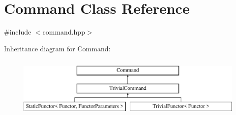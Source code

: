 \hypertarget{class_command}{}\section{Command Class Reference}
\label{class_command}


{\ttfamily \#include $<$command.\+hpp$>$}

Inheritance diagram for Command\+:\begin{figure}[H]
\begin{center}
\leavevmode
\includegraphics[height=3.000000cm]{class_command}
\end{center}
\end{figure}
